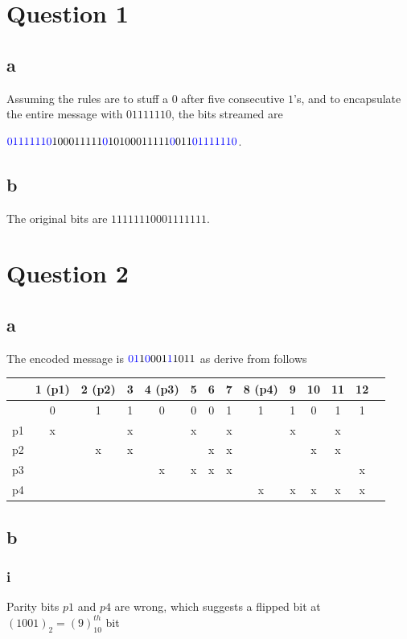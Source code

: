 \documentclass{report}
\begin{document}
  \section*{Question 1}
    \subsection*{a}
      Assuming the rules are to stuff a $0$ after five consecutive $1$'s, 
      and to encapsulate the entire message with $01111110$,
      the bits streamed are

      ${\color{blue}01111110}100011111{\color{blue}0}10100011111{\color{blue}0}011{\color{blue}01111110}$.
    \subsection*{b}
      The original bits are $11111110001111111$.
  
  \section*{Question 2}
    \subsection*{a}
      The encoded message is ${\color{blue}0}{\color{blue}1}1{\color{blue}0}001{\color{blue}1}1011$
      as derive from follows
      \begin{center}
        \begin{tabular}{|c|c|c|c|c|c|c|c|c|c|c|c|c|c|}
          \hline
          &1 (p1)&2 (p2)&3&4 (p3)&5&6&7&8 (p4)&9&10&11&12\\
          \hline
          &0&1&1&0&0&0&1&1&1&0&1&1 \\
          \hline
          p1&x& &x& &x& &x& &x& &x& \\
          \hline
          p2& &x&x& & &x&x& & &x&x& \\
          \hline
          p3& & & &x&x&x&x& & & & &x \\
          \hline
          p4& & & & & & & &x&x&x&x&x \\ 
          \hline
        \end{tabular}
      \end{center}
    \subsection*{b}
      \subsubsection*{i}
        Parity bits $p1$ and $p4$ are wrong, which suggests a flipped bit at
        $(1001)_2 = (9)_{10}^{th}$ bit 
\end{document}
